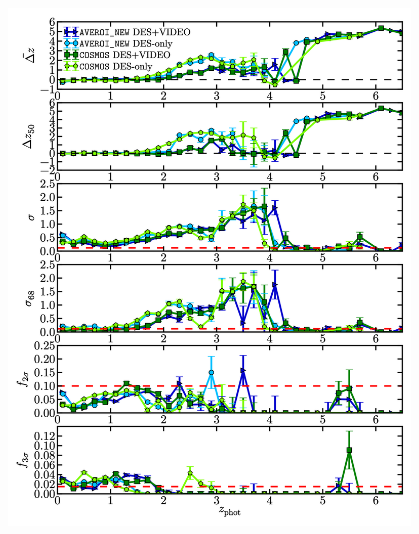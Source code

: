 \begin{figure}[!htp]
\centering
\includegraphics[width=0.95\textwidth]{Chapter3/Figs/basic_des_only_cosmos_cosmos_des_only_photz_long.png}

\end{figure}
